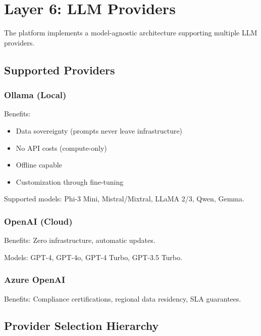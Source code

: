 \documentclass[a4paper,twoside]{sapthesis}
\begin{document}
\section{Layer 6: LLM Providers}
\label{sec:layer6-llm}

The platform implements a model-agnostic architecture supporting multiple LLM providers.

\subsection{Supported Providers}
\label{subsec:llm-providers}

\subsubsection{Ollama (Local)}

Benefits:
\begin{itemize}
    \item Data sovereignty (prompts never leave infrastructure)
    \item No API costs (compute-only)
    \item Offline capable
    \item Customization through fine-tuning
\end{itemize}

Supported models: Phi-3 Mini, Mistral/Mixtral, LLaMA 2/3, Qwen, Gemma.

\subsubsection{OpenAI (Cloud)}

Benefits: Zero infrastructure, automatic updates.

Models: GPT-4, GPT-4o, GPT-4 Turbo, GPT-3.5 Turbo.

\subsubsection{Azure OpenAI}

Benefits: Compliance certifications, regional data residency, SLA guarantees.

\subsection{Provider Selection Hierarchy}
\label{subsec:provider-selection}
\end{document}
